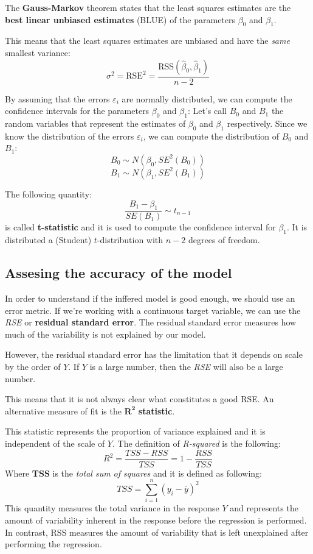 The \textbf{Gauss-Markov} theorem states that the least squares estimates are the \textbf{best linear unbiased estimates} (BLUE) of the parameters $\beta_0$ and $\beta_1$.

This means that the least squares estimates are unbiased and have the \textit{same} smallest variance:
\[
    \sigma^2 = \text{RSE}^2 = \frac{\text{RSS}(\hat{\beta}_0, \hat{\beta}_1)}{n-2}
\]

By assuming that the errors $\varepsilon_i$ are normally distributed, we can compute the confidence intervals for the parameters $\beta_0$ and $\beta_1$:
Let's call $B_0$ and $B_1$ the random variables that represent the estimates of $\beta_0$ and $\beta_1$ respectively. Since we know the distribution of the errors $\varepsilon_i$, we can compute the distribution of $B_0$ and $B_1$:
\[
    B_0 \sim N(\beta_0, SE^2(B_0))
\]
\[
    B_1 \sim N(\beta_1, SE^2(B_1))
\]

The following quantity:
\[
    \frac{B_1 - \beta_1}{SE(B_1)} \sim t_{n-1}
\]
is called \textbf{t-statistic} and it is used to compute the confidence interval for $\beta_1$. It is distributed a (Student) $t$-distribution with $n-2$ degrees of freedom.

\subsection{Assesing the accuracy of the model}
In order to understand if the inffered model is good enough, we should use an error metric. If we're working with a continuous target variable, we can use the \textit{RSE} or \textbf{residual standard error}. The residual standard error measures how much of the variability is not explained by our model.

However, the residual standard error has the limitation that it depends on scale by the order of $Y$. If $Y$ is a large number, then the \textit{RSE} will also be a large number.

This means that it is not always clear what constitutes a good RSE. An alternative measure of fit is the $\mathbf{R^2}$ \textbf{statistic}.

This statistic represents the proportion of variance explained and it is independent of the scale of $Y$. The definition of \textit{R-squared} is the following:
\[
    R^2 = \frac{TSS - RSS}{TSS} = 1 - \frac{RSS}{TSS}
\]
Where \textbf{TSS} is the \textit{total sum of squares} and it is defined as following:
\[
    TSS = \sum_{i=1}^{n} (y_i - \overline{y})^2
\]
This quantity measures the total variance in the response $Y$ and represents the amount of variability inherent in the response before the regression is performed. In contrast, RSS measures the amount of variability that is left unexplained after performing the regression.

